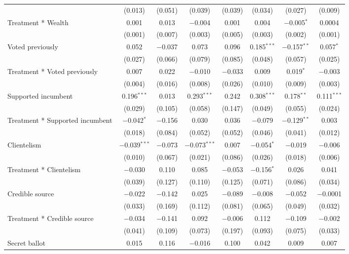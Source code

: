 \documentclass[]{article}
\begin{document}
\begin{table}[!htbp]
\begin{tabular}{@{\extracolsep{1pt}}lccccccc}
  & (0.013) & (0.051) & (0.039) & (0.039) & (0.034) & (0.027) & (0.009) \\ 
  Treatment * Wealth & 0.001 & 0.013 & $-$0.004 & 0.001 & 0.004 & $-$0.005$^{*}$ & 0.0004 \\ 
  & (0.001) & (0.007) & (0.003) & (0.005) & (0.003) & (0.002) & (0.001) \\ 
  Voted previously & 0.052 & $-$0.037 & 0.073 & 0.096 & 0.185$^{***}$ & $-$0.157$^{**}$ & 0.057$^{*}$ \\ 
  & (0.027) & (0.066) & (0.079) & (0.085) & (0.048) & (0.057) & (0.025) \\ 
  Treatment * Voted previously & 0.007 & 0.022 & $-$0.010 & $-$0.033 & 0.009 & 0.019$^{*}$ & $-$0.003 \\ 
  & (0.004) & (0.016) & (0.008) & (0.026) & (0.010) & (0.009) & (0.003) \\ 
  Supported incumbent & 0.196$^{***}$ & 0.013 & 0.293$^{***}$ & 0.242 & 0.308$^{***}$ & 0.178$^{**}$ & 0.111$^{***}$ \\ 
  & (0.029) & (0.105) & (0.058) & (0.147) & (0.049) & (0.055) & (0.024) \\ 
  Treatment * Supported incumbent & $-$0.042$^{*}$ & $-$0.156 & 0.030 & 0.036 & $-$0.079 & $-$0.129$^{**}$ & 0.003 \\ 
  & (0.018) & (0.084) & (0.052) & (0.052) & (0.046) & (0.041) & (0.012) \\ 
  Clientelism & $-$0.039$^{***}$ & $-$0.073 & $-$0.073$^{***}$ & 0.007 & $-$0.054$^{*}$ & $-$0.019 & $-$0.006 \\ 
  & (0.010) & (0.067) & (0.021) & (0.086) & (0.026) & (0.018) & (0.006) \\ 
  Treatment * Clientelism & $-$0.030 & 0.110 & 0.085 & $-$0.053 & $-$0.156$^{*}$ & 0.026 & 0.041 \\ 
  & (0.039) & (0.127) & (0.110) & (0.125) & (0.071) & (0.086) & (0.034) \\ 
  Credible source & $-$0.022 & $-$0.142 & 0.025 & $-$0.089 & $-$0.008 & $-$0.052 & $-$0.0001 \\ 
  & (0.033) & (0.169) & (0.112) & (0.081) & (0.065) & (0.049) & (0.032) \\ 
  Treatment * Credible source & $-$0.034 & $-$0.141 & 0.092 & $-$0.006 & 0.112 & $-$0.109 & $-$0.002 \\ 
  & (0.041) & (0.109) & (0.073) & (0.197) & (0.093) & (0.075) & (0.033) \\ 
  Secret ballot & 0.015 & 0.116 & $-$0.016 & 0.100 & 0.042 & 0.009 & 0.007 \\ 

\end{tabular}
\end{table}
\end{document}
